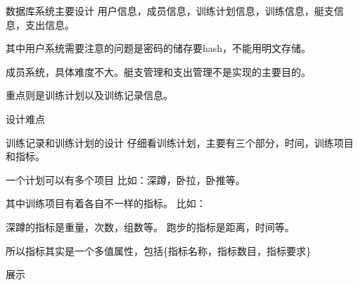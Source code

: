 \documentclass{beamer}
\begin{document}
\begin{frame}{数据库系统主要设计}
  用户信息，成员信息，训练计划信息，训练信息，艇支信息，支出信息。

  其中用户系统需要注意的问题是密码的储存要hash，不能用明文存储。

  成员系统，具体难度不大。艇支管理和支出管理不是实现的主要目的。

  重点则是训练计划以及训练记录信息。
  
\end{frame}

\begin{frame}{设计难点}

   {训练记录和训练计划的设计
    仔细看训练计划，主要有三个部分，时间，训练项目和指标。

    一个计划可以有多个项目
    比如：深蹲，卧拉，卧推等。
   
    其中训练项目有着各自不一样的指标。
    比如：

    深蹲的指标是重量，次数，组数等。
    跑步的指标是距离，时间等。

    所以指标其实是一个多值属性，包括\{指标名称，指标数目，指标要求\}
  }
  
  
    
\end{frame}
  
\begin{frame}{展示}

\end{frame}
\end{document}
